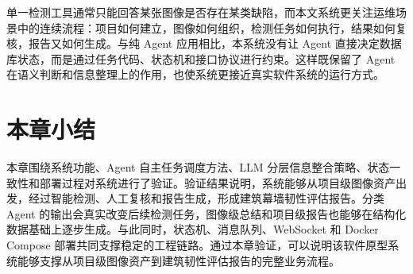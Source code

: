 单一检测工具通常只能回答某张图像是否存在某类缺陷，而本文系统更关注运维场景中的连续流程：项目如何建立，图像如何组织，检测任务如何执行，结果如何复核，报告又如何生成。与纯 Agent 应用相比，本系统没有让 Agent 直接决定数据库状态，而是通过任务代码、状态机和接口协议进行约束。这样既保留了 Agent 在语义判断和信息整理上的作用，也使系统更接近真实软件系统的运行方式。

\section{本章小结}
\label{sec:validation-chapter-summary}

本章围绕系统功能、Agent 自主任务调度方法、LLM 分层信息整合策略、状态一致性和部署过程对系统进行了验证。验证结果说明，系统能够从项目级图像资产出发，经过智能检测、人工复核和报告生成，形成建筑幕墙韧性评估报告。分类 Agent 的输出会真实改变后续检测任务，图像级总结和项目级报告也能够在结构化数据基础上逐步生成。与此同时，状态机、消息队列、WebSocket 和 Docker Compose 部署共同支撑稳定的工程链路。通过本章验证，可以说明该软件原型系统能够支撑从项目级图像资产到建筑韧性评估报告的完整业务流程。
